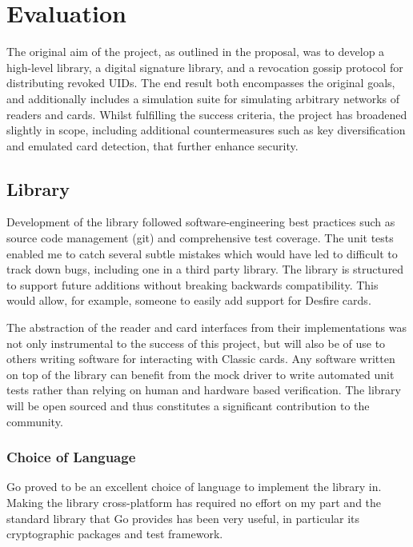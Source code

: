 \documentclass[dissertation.tex]{subfiles}
\begin{document}
  \chapter{Evaluation}


  The original aim of the project, as outlined in the proposal, was to develop a high-level \mifare{} library, a \mifare{} digital signature library, and a revocation gossip protocol for distributing revoked UIDs. The end result both encompasses the original goals, and additionally includes a simulation suite for simulating arbitrary networks of readers and cards. Whilst fulfilling the success criteria, the project has broadened slightly in scope, including additional countermeasures such as key diversification and emulated card detection, that further enhance security.

  \section{\mifare{} Library}
  Development of the \mifare{} library followed software-engineering best practices such as source code management (git) and comprehensive test coverage. The unit tests enabled me to catch several subtle mistakes which would have led to difficult to track down bugs, including one in a third party library. The library is structured to support future additions without breaking backwards compatibility. This would allow, for example, someone to easily add support for \mifare{} Desfire cards.

  The abstraction of the reader and card interfaces from their implementations was not only instrumental to the success of this project, but will also be of use to others writing software for interacting with \mifare{} Classic cards. Any software written on top of the library can benefit from the mock driver to write automated unit tests rather than relying on human and hardware based verification. The library will be open sourced and thus constitutes a significant contribution to the community.

  \subsection{Choice of Language}
  Go proved to be an excellent choice of language to implement the library in. Making the library cross-platform has required no effort on my part and the standard library that Go provides has been very useful, in particular its cryptographic packages and test framework.
\end{document}
